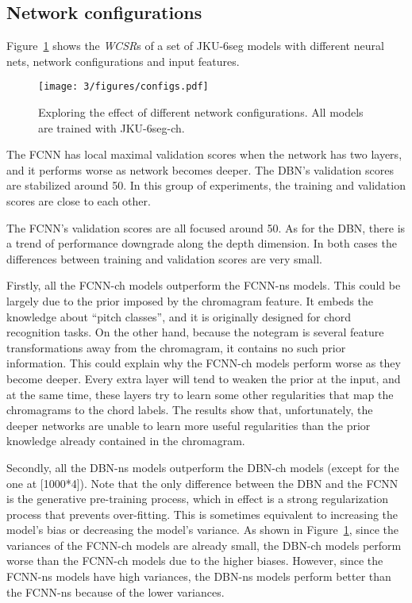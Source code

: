 \subsection{Network configurations} \label{sec:3-p2}

Figure~\ref{fig:3-configs} shows the \textit{WCSR}s of a set of JKU-6seg models with different neural nets, network configurations and input features.
\begin{figure}[h!]
	\centering
	\texttt{[image: 3/figures/configs.pdf]}
	\caption{Exploring the effect of different network configurations. All models are trained with JKU-6seg-ch.}
	\label{fig:3-configs}
\end{figure}
The FCNN has local maximal validation scores when the network has two layers, and it performs worse as  network becomes deeper. The DBN's validation scores are stabilized around 50. In this group of experiments, the training and validation scores are close to each other.

The FCNN's validation scores are all focused around 50. As for the DBN, there is a trend of performance downgrade along the depth dimension. In both cases the differences between training and validation scores are very small.

Firstly, all the FCNN-ch models outperform the FCNN-ns models. This could be largely due to the prior imposed by the chromagram feature. It embeds the knowledge about ``pitch classes'', and it is originally designed for chord recognition tasks. On the other hand, because the notegram is several feature transformations away from the chromagram, it contains no such prior information. This could explain why the FCNN-ch models perform worse as they become deeper. Every extra layer will tend to weaken the prior at the input, and at the same time, these layers try to learn some other regularities that map the chromagrams to the chord labels. The results show that, unfortunately, the deeper networks are unable to learn more useful regularities than the prior knowledge already contained in the chromagram.

Secondly, all the DBN-ns models outperform the DBN-ch models (except for the one at [1000*4]). Note that the only difference between the DBN and the FCNN is the generative pre-training process, which in effect is a strong regularization process that prevents over-fitting. This is sometimes equivalent to increasing the model's bias or decreasing the model's variance. As shown in Figure~\ref{fig:3-configs}, since the variances of the FCNN-ch models are already small, the DBN-ch models perform worse than the FCNN-ch models due to the higher biases. However, since the FCNN-ns models have high variances, the DBN-ns models perform better than the FCNN-ns because of the lower variances.

